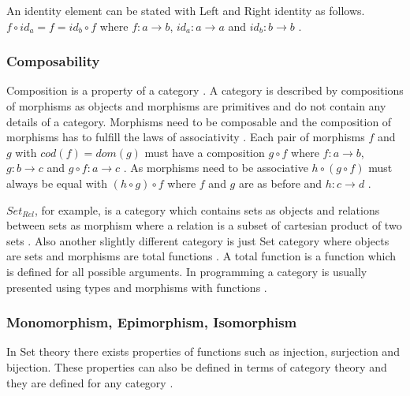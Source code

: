 \documentclass[article]{aaltoseries}
\begin{document}
    An identity element can be stated with Left and Right identity as follows.
    $f \circ id_a = f = id_b \circ f$ where $f: a \rightarrow b$, $id_a: a
    \rightarrow a$ and $id_b: b \rightarrow b$ \cite{computational, barr1990category}.


  \subsubsection{Composability}
    Composition is a property of a category \cite{barr1990category,
      mac2013categories}. A category is described by compositions of morphisms
    as objects and morphisms are primitives and do not contain any details of a
    category. Morphisms need to be composable and the composition of morphisms
    has to fulfill the laws of associativity \cite{barr1990category,
      computational, mac2013categories}. Each pair of morphisms $f$ and $g$ with
    $cod(f) = dom(g)$ must have a composition $g \circ f$ where $f: a
    \rightarrow b$, $g: b \rightarrow c$ and $g \circ f: a \rightarrow c$
    \cite{mac2013categories}. As morphisms need to be associative $h \circ (g
    \circ f)$ must always be equal with $(h \circ g) \circ f$ where $f$ and $g$
    are as before and $h: c \rightarrow d$ \cite{eilenberg1945general,
      computational, barr1990category, awodey2006category, mac2013categories}.
 
    $Set_{Rel}$, for example, is a category which contains sets as
    objects and relations between sets as morphism where a relation is a subset
    of cartesian product of two sets \cite{computational}. Also another slightly
    different category is just Set category where objects are sets and morphisms
    are total functions \cite{barr1990category, computational}. A total function
    is a function which is defined for all possible arguments. In programming a
    category is usually presented using types and morphisms with functions
    \cite{computational}.


  \subsubsection{Monomorphism, Epimorphism, Isomorphism}
    In Set theory there exists properties of functions such as injection,
    surjection and bijection. These properties can also be defined in terms of
    category theory and they are defined for any category \cite{barr1990category}.
\end{document}

